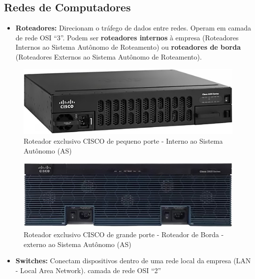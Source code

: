 \documentclass[
]{book}
\providecommand{\tightlist}{%
  \setlength{\itemsep}{0pt}\setlength{\parskip}{0pt}}
\begin{document}
\subsection{Redes de Computadores}\label{redes-de-computadores}

\begin{itemize}
\tightlist
\item
  \textbf{Roteadores:} Direcionam o tráfego de dados entre redes. Operam em camada de rede OSI ``3''. Podem ser \textbf{roteadores internos} à empresa (Roteadores Internos ao Sistema Autônomo de Roteamento) ou \textbf{roteadores de borda} (Roteadores Externos ao Sistema Autônomo de Roteamento).
\end{itemize}

\begin{figure}
\centering
\includegraphics{images/InfraEstrutura/Redes/roteador-cisco.jpg}
\caption{Roteador exclusivo CISCO de pequeno porte - Interno ao Sistema Autônomo (AS)}
\end{figure}

\begin{figure}
\centering
\includegraphics{images/InfraEstrutura/Redes/roteador-cisco-3900.jpg}
\caption{Roteador exclusivo CISCO de grande porte - Roteador de Borda - externo ao Sistema Autônomo (AS)}
\end{figure}

\begin{itemize}
\tightlist
\item
  \textbf{Switches:} Conectam dispositivos dentro de uma rede local da empresa (LAN - Local Area Network). camada de rede OSI ``2''
\end{itemize}
\end{document}
